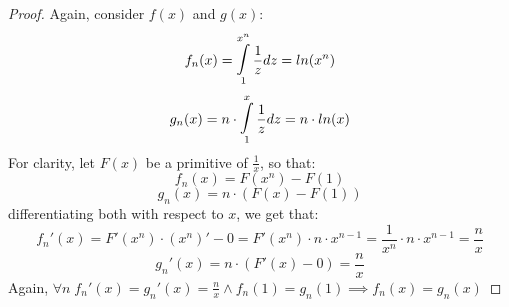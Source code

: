 \documentclass[12pt,oneside,a4paper]{article}
\begin{document}
\begin{proof}
Again, consider $f(x)$ and $g(x)$:
\begin{equation}
f_n(x)= \mathop{\mathlarger{\mathlarger{\int}}}_{1}^{x ^n} \frac{1}{z} dz
= ln(x^n)
\end{equation}
\begin{equation}
g_n(x)= n \cdot \mathop{\mathlarger{\mathlarger{\int}}}_{1}^{x} \frac{1}{z} dz = n\cdot ln(x)
\end{equation}
For clarity, let $F(x)$ be a primitive of $\frac{1}{x}$, so that:
\begin{equation}
f_n(x)= F(x^n) - F(1)
\end{equation}
\begin{equation}
g_n(x)= n\cdot ( F(x) - F(1))
\end{equation}
differentiating both with respect to $x$, we get that:
\begin{equation}
f_n'(x)= F'(x^n) \cdot (x^n)' -0 = F'(x^n) \cdot n \cdot x^{n-1} = \frac{1}{x^n}\cdot n \cdot x^{n-1} = \frac{n}{x}
\end{equation}
\begin{equation}
g_n'(x)= n\cdot ( F'(x) - 0) = \frac{n}{x}
\end{equation}
Again, $\forall n \; f_n'(x)=g_n'(x) = \frac{n}{x} \land f_n(1)=g_n(1) \implies f_n(x) = g_n(x)$
\end{proof}
\end{document}
